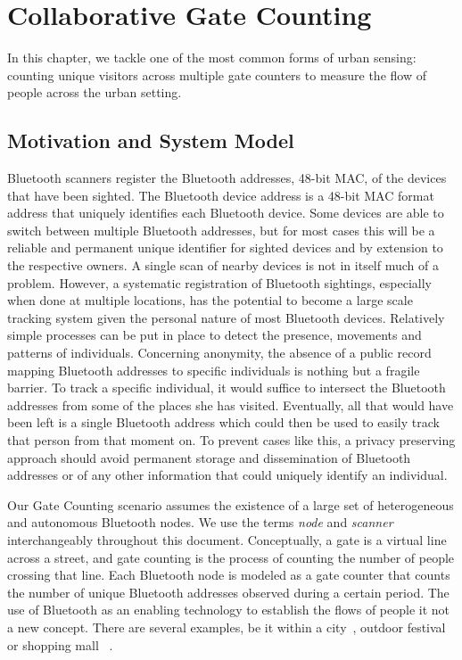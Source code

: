 \chapter{Collaborative Gate Counting}
\label{cha:gate-counting}

In this chapter, we tackle one of the most common forms of urban
sensing: counting unique visitors across multiple gate counters to
measure the flow of people across the urban setting. 

\section {Motivation and System Model}
\label{sec:motivation}

Bluetooth scanners register the Bluetooth addresses, 48-bit MAC, of
the devices that have been sighted. The Bluetooth device address is a
48-bit MAC format address that uniquely identifies each Bluetooth
device. Some devices are able to switch between multiple Bluetooth
addresses, but for most cases this will be a reliable and permanent
unique identifier for sighted devices and by extension to the
respective owners. A single scan of nearby devices is not in itself
much of a problem. However, a systematic registration of Bluetooth
sightings, especially when done at multiple locations, has the
potential to become a large scale tracking system given the personal
nature of most Bluetooth devices. Relatively simple processes can be
put in place to detect the presence, movements and patterns of
individuals. Concerning anonymity, the absence of a public record
mapping Bluetooth addresses to specific individuals is nothing but a
fragile barrier. To track a specific individual, it would suffice to
intersect the Bluetooth addresses from some of the places she has
visited. Eventually, all that would have been left is a single
Bluetooth address which could then be used to easily track that person
from that moment on. To prevent cases like this, a privacy preserving
approach should avoid permanent storage and dissemination of Bluetooth
addresses or of any other information that could uniquely identify an
individual.

Our Gate Counting scenario assumes the existence of a large set
of heterogeneous and autonomous Bluetooth nodes. We use the terms
\emph{node} and \emph{scanner} interchangeably throughout this document.
Conceptually, a gate is a virtual line across a street, and gate
counting is the process of counting the number of people crossing that
line. Each Bluetooth node is modeled as a gate counter that counts the
number of unique Bluetooth addresses observed during a certain period.
The use of Bluetooth as an enabling technology to establish the flows
of people it not a new concept. There are several examples, be it
within a city~\cite{Oneill:2006vq}, outdoor
festival~\cite{versichele2012use} or shopping mall
~\cite{millonig2008shadowing}.

